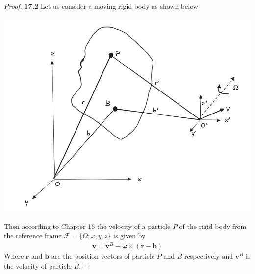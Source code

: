 \documentclass[11pt]{article}
\theoremstyle{definition}
\begin{document}
\begin{proof}{\textbf{17.2}}
    Let us consider a moving rigid body as shown below
    \begin{center}
        \includegraphics[scale=0.5]{ch17-2.png}
    \end{center}

    Then according to Chapter 16 the velocity of a particle $P$ of the rigid
    body from the reference frame $\mathcal{F} = \{O;x,y,z\}$ is given by
    \begin{align*}
        \bm{v} = \bm{v}^B + \bm{\omega}\times (\bm{r} - \bm{b})
    \end{align*}
    Where $\bm{r}$ and $\bm{b}$ are the position vectors of particle $P$ and
    $B$ respectively and $\bm{v}^B$ is the velocity of particle $B$.


\end{proof}
\end{document}
